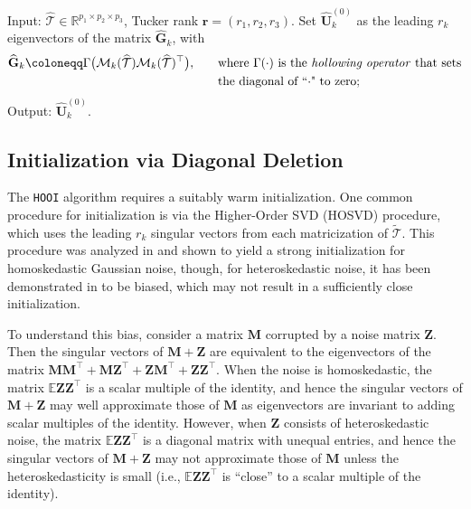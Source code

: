 \documentclass[10pt]{article}
\newcommand{\0}{{\mathbf{0}}}
\newcommand{\1}{{\mathbf{1}}}
\newcommand{\br}{\boldsymbol{r}}
\renewcommand{\citet}{\cite}
\renewcommand{\t}{^{\top}}
\newcommand{\uhat}{\mathbf{\hat{U}}}
\renewcommand{\tilde}{\widetilde}
\renewcommand{\hat}{\widehat}
\renewcommand{\hat}{\widehat}
\begin{document}
\begin{algorithm}[t]
	\caption{Diagonal-Deletion Initialization}
	\begin{algorithmic}[1]
		\State Input: $\mathcal{\widehat{T}}\in \mathbb{R}^{p_1 \times p_2 \times p_3}$, Tucker rank $\br = (r_1, r_2,r_3)$.
		\State Set $\uhat_k^{(0)}$ as the leading $r_k$ eigenvectors of the matrix $\mathbf{\widehat{G}}_k$, with
		\begin{align*}
		\mathbf{\widehat{G}}_k \coloneqq 
	 \Gamma\big(\mathcal{M}_k ( \mathcal{\widehat{T}}) \mathcal{M}_k(\mathcal{\widehat{T}})\t \big), \qquad &\text{where $\Gamma(\cdot)$ is the \emph{hollowing operator} that sets} \\
  \qquad &\text{the diagonal of ``$\cdot$" to zero;}
		\end{align*}
		\EndFor
		\State Output: $\uhat_k^{(0)}$.
	\end{algorithmic}\label{al:dd}
\end{algorithm}



\subsection{Initialization via Diagonal Deletion}
The \texttt{HOOI} algorithm requires a suitably warm initialization.  One common procedure for initialization is via the Higher-Order SVD (HOSVD) procedure, which uses the leading $r_k$ singular vectors from each matricization of $\mathcal{\tilde{T}}$.  This procedure was analyzed in \citet{zhang_tensor_2018} and shown to yield a strong initialization for homoskedastic Gaussian noise, though, for heteroskedastic noise, it has been demonstrated in \citet{zhang_heteroskedastic_2022} to be biased, which may  not result in a sufficiently close initialization.  

 To understand  this bias, consider a matrix $\mathbf{M}$ corrupted by a noise matrix $\mathbf{Z}$.  Then the singular vectors of $\mathbf{M} + \mathbf{Z}$ are equivalent to the eigenvectors of the matrix $\mathbf{MM}\t + \mathbf{MZ}\t + \mathbf{ZM}\t + \mathbf{ZZ}\t$.  When the noise is homoskedastic, the matrix $\mathbb{E}\mathbf{ZZ}\t$ is a scalar multiple of the identity, and hence the singular vectors of $\mathbf{M + Z}$ may well approximate those of $\mathbf{M}$ as eigenvectors are invariant to adding scalar multiples of the identity.  However, when $\mathbf{Z}$ consists of heteroskedastic noise, the matrix $\mathbb{E} \mathbf{ZZ}\t$ is a diagonal matrix with unequal entries, and hence the singular vectors of $\mathbf{M + Z}$ may not approximate those of $\mathbf{M}$ unless the heteroskedasticity is small (i.e., $\mathbb{E}\mathbf{ZZ}\t$ is ``close'' to a scalar multiple of the identity). %
\end{document}
